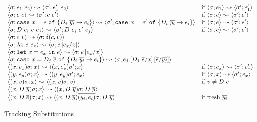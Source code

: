 \renewcommand\evalt[4]{{\teval{#1}{#3}{#2}{#4}}}

\begin{figure*}
\hfill\mbox{\evalt{\sigma}{\sigma}{e}{e}}
$$
\begin{array}{ll}
	\evalt{\sigma}{\sigma'}{\eapp{e_1}{e_2}}{\eapp{e_1'}{e_2}} 
	& \text{if}\ 
	\evalt{\sigma}{\sigma'}{e_1}{e_1'}\\
	\evalt{\sigma}{\sigma'}{\eapp{c}{e}}{\eapp{c}{e'}} 
	& \text{if}\ 
	\evalt{\sigma}{\sigma'}{e}{e'}\\
	\evalt{\sigma}{\sigma'}{\ecase{e}{D_i}{\overline{y_i}}{e_i}{x}}{\ecase{e'}{D_i}{\overline{y_i}}{e_i}{x}}
	&\text{if}\ \evalt{\sigma}{\sigma'}{e}{e'} \\
	\evalt{\sigma}{\sigma'}
		{D\ \overline{e_i}\ e\ \overline{e_j}}
		{D\ \overline{e_i}\ e'\ \overline{e_j}}
	&\text{if}\ \evalt{\sigma}{\sigma'}{e}{e'} \\
	\evalt{\sigma}{\sigma}{\eapp{c}{v}}{\ceval{c}{v}} &\\
	\evalt{\sigma}{\sigma}{\eapp{\efun{x}{}{e}}{e_x}}{e\sub{x}{e_x}} &\\
	\evalt{\sigma}{\sigma}{\elet{x}{e_x}{e}}{e\sub{x}{e_x}}& \\
	\evalt{\sigma}{\sigma}{\ecase{D_j\ \overline{e}}{D_i}{\overline{y_i}}{e_i}{x}}{e_j\sub{x}{D_j\ 			\overline{e}}\sub{\overline{y_j}}{\overline{e}}} \\
\teval{(x,e_x)\sigma}{x}{(x,e'_x)\sigma'}{x} &\text{if}\ \teval{\sigma}{e_x}{\sigma'}{e'_x}\\
	\teval{(y,e_y)\sigma}{x}{(y,e_y)\sigma'}{e_x}
  &\text{if}\
	\teval{\sigma}{x}{\sigma'}{e_x}\\
	\teval{(x,v)\sigma}{x}{(x,v)\sigma}{v}
  &\text{if}\
  v \not = D\ \overline{e}\\
	\teval{(x,D\ \overline{y})\sigma}{x}{(x,D\ \overline{y})\sigma}{D\ \overline{y}}
  &\\
	\teval{(x,D\ \overline{e})\sigma}{x}{(x,D\ \overline{y})\overline{(y_i, e_i)}\sigma}{D\ \overline{y}}
  &\text{if}\
	\text{fresh}\ \overline{y_i}
  \\
\end{array}
$$
\caption{Tracking Substitutions}
\label{fig:proofs:tracking}
\end{figure*}